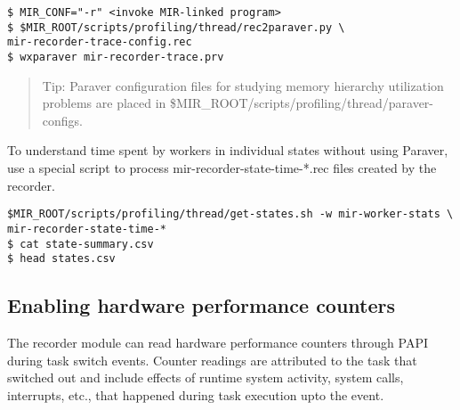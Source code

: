 \documentclass[11pt,a4paper]{article}
\begin{document}
\begin{lstlisting}[style=MyInputStyle]
$ MIR_CONF="-r" <invoke MIR-linked program>
$ $MIR_ROOT/scripts/profiling/thread/rec2paraver.py \
mir-recorder-trace-config.rec
$ wxparaver mir-recorder-trace.prv
\end{lstlisting}

\begin{framed}
\begin{quote}
Tip: Paraver configuration files for studying memory hierarchy utilization problems are placed in \textsf{\$MIR\_ROOT/scripts/profiling/thread/paraver-configs}.
\end{quote}
\end{framed}

To understand time spent by workers in individual states without using Paraver, use a special script to process \textsf{mir-recorder-state-time-*.rec} files created by the recorder.

\begin{lstlisting}[style=MyInputStyle]
$MIR_ROOT/scripts/profiling/thread/get-states.sh -w mir-worker-stats \
mir-recorder-state-time-*
$ cat state-summary.csv
$ head states.csv
\end{lstlisting}

\subsection{Enabling hardware performance counters}\label{sec:enabling-hardware-performance-counters}

The recorder module can read hardware performance counters through PAPI during task switch events.
Counter readings are attributed to the task that switched out and include effects of runtime system activity, system calls, interrupts, etc., that happened during task execution upto the event.
\end{document}
